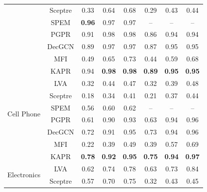 \documentclass[review]{elsarticle}
\begin{document}
\begin{sloppypar}
\begin{table}[]
\begin{tabular}{c|c|ccc|ccc}
                             & Sceptre  & 0.33           & 0.64           & 0.68           & 0.29          & 0.43           & 0.44           \\
                             & SPEM     & \textbf{0.96}  & 0.97           & 0.97           & --             & --              & --             \\
                             & PGPR     & 0.91          & 0.98           & 0.98           & 0.86          & 0.94          & 0.94          \\
                             & DecGCN   &0.89            & 0.97           & 0.97           & 0.87         &  0.95          &  0.95          \\
                             & MFI      & 0.49           & 0.65           & 0.73           & 0.44          & 0.59           & 0.68           \\
                             & KAPR     & 0.94           & \textbf{0.98}  & \textbf{0.98}  & \textbf{0.89} & \textbf{0.95} & \textbf{0.95} \\ \hline
\multirow{6}{*}{Cell Phone} & LVA      & 0.32           & 0.44           & 0.47           & 0.32          & 0.39           & 0.48           \\
                             & Sceptre  & 0.18           & 0.34           & 0.41           & 0.21          & 0.37           & 0.44           \\
                             & SPEM     & 0.56           & 0.60           & 0.62           & --            & --              & --              \\
                             & PGPR     & 0.61           & 0.90           & 0.93           & 0.63          & 0.94          & 0.96           \\
                             & DecGCN   &  0.72          &  0.91          & 0.95           &  0.73        &   0.94         &  0.96          \\
                             & MFI      & 0.22           & 0.39           & 0.49           & 0.39          & 0.57           & 0.69           \\
                             & KAPR     & \textbf{0.78}  & \textbf{0.92}  & \textbf{0.95}  & \textbf{0.75} & \textbf{0.94}  & \textbf{0.97}  \\ \hline
\multirow{6}{*}{Electronics} & LVA      & 0.62           & 0.74           & 0.78           & 0.63          & 0.73           & 0.84           \\
                             & Sceptre  & 0.57           & 0.70           & 0.75           & 0.32          & 0.43           & 0.45           \\

\end{tabular}
\end{table}
\end{sloppypar}
\end{document}

